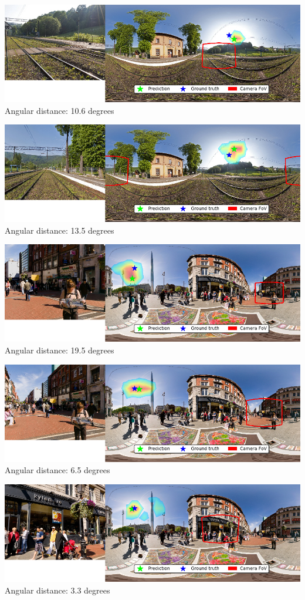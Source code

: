 \begin{multicols}{2}
\includegraphics[width=\mywidth]{pano_aasclkvkavzoym_005.jpg}\\
Angular distance: 10.6 degrees

\includegraphics[width=\mywidth]{pano_aasclkvkavzoym_006.jpg}\\
Angular distance: 13.5 degrees

\includegraphics[width=\mywidth]{pano_aasokgzjhapcau_002.jpg}\\
Angular distance: 19.5 degrees

\includegraphics[width=\mywidth]{pano_aasokgzjhapcau_003.jpg}\\
Angular distance: 6.5 degrees

\includegraphics[width=\mywidth]{pano_aasokgzjhapcau_004.jpg}\\
Angular distance: 3.3 degrees


\end{multicols}
